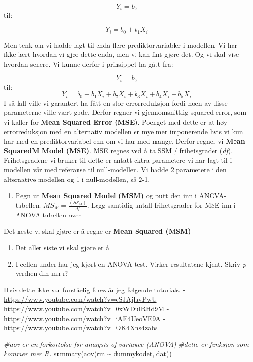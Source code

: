 \documentclass[
]{book}
\newenvironment{Shaded}{\begin{snugshade}}{\end{snugshade}}
\newcommand{\CommentTok}[1]{\textcolor[rgb]{0.56,0.35,0.01}{\textit{#1}}}
\newcommand{\FunctionTok}[1]{\textcolor[rgb]{0.00,0.00,0.00}{#1}}
\newcommand{\NormalTok}[1]{#1}
\newcommand{\SpecialCharTok}[1]{\textcolor[rgb]{0.00,0.00,0.00}{#1}}
\providecommand{\tightlist}{%
  \setlength{\itemsep}{0pt}\setlength{\parskip}{0pt}}
\begin{document}
\[
Y_i = b_0
\]
til:

\[
Y_i = b_0 + b_1X_i
\]

Men tenk om vi hadde lagt til enda flere prediktorvariabler i modellen. Vi har ikke lært hvordan vi gjør dette enda, men vi kan fint gjøre det. Og vi skal vise hvordan senere. Vi kunne derfor i prinsippet ha gått fra:

\[
Y_i = b_0
\]
til:
\[
Y_i  = b_0 + b_1X_i + b_2X_i + b_3X_i + b_4X_i + b_5X_i
\]
I så fall ville vi garantert ha fått en stor errorreduksjon fordi noen av disse parameterne ville vært gode. Derfor regner vi gjennomsnittlig squared error, som vi kaller for \textbf{Mean Squared Error (MSE)}. Poenget med dette er at høy errorreduksjon med en alternativ modellen er mye mer imponerende hvis vi kun har med en prediktorvariabel enn om vi har med mange. Derfor regner vi \textbf{Mean SquaredM Model (MSE)}. MSE regnes ved å ta SSM / frihetsgrader (\emph{df}). Frihetsgradene vi bruker til dette er antatt ektra parametere vi har lagt til i modellen vår med referanse til null-modellen. Vi hadde 2 parametere i den alternative modellen og 1 i null-modellen, så 2-1.

\begin{enumerate}
\def\labelenumi{\alph{enumi}.}
\setcounter{enumi}{5}
\tightlist
\item
  Regn ut \textbf{Mean Squared Model (MSM)} og putt den inn i ANOVA-tabellen. \(MS_M=\frac{(SS_M)}{df}\). Legg samtidig antall frihetsgrader for MSE inn i ANOVA-tabellen over.
\end{enumerate}

Det neste vi skal gjøre er å regne er \textbf{Mean Squared (MSM)}

\begin{enumerate}
\def\labelenumi{\alph{enumi}.}
\setcounter{enumi}{6}
\item
  Det aller siste vi skal gjøre er å
\item
  I cellen under har jeg kjørt en ANOVA-test. Virker resultatene kjent. Skriv \emph{p}-verdien din inn i?
\end{enumerate}

Hvis dette ikke var forståelig foreslår jeg følgende tutorials:
- \url{https://www.youtube.com/watch?v=eSJAjlavPwU}
- \url{https://www.youtube.com/watch?v=0xWDulRHd9M}
- \url{https://www.youtube.com/watch?v=iAE4UeoVE9A}
- \url{https://www.youtube.com/watch?v=OK4Xns4zabs}

\begin{Shaded}
\begin{Highlighting}[]
\CommentTok{\#aov er en forkortolse for analysis of variance (ANOVA)}
\CommentTok{\#dette er funksjon som kommer mer R.}
\FunctionTok{summary}\NormalTok{(}\FunctionTok{aov}\NormalTok{(rm }\SpecialCharTok{\textasciitilde{}}\NormalTok{ dummykodet, dat))}
\end{Highlighting}
\end{Shaded}
\end{document}

